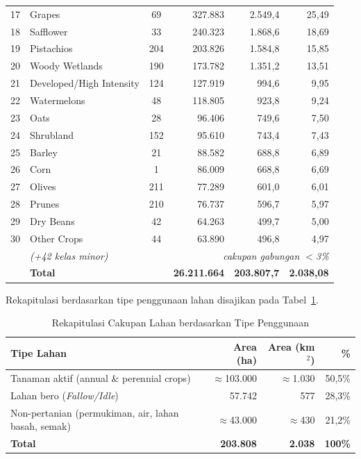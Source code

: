 \begin{longtable}{|r|p{4.5cm}|c|r|r|r|}
17 & Grapes                     & 69  &   327.883 &  2.549,4 &  25,49 \\
18 & Safflower                  & 33  &   240.323 &  1.868,6 &  18,69 \\
19 & Pistachios                 & 204 &   203.826 &  1.584,8 &  15,85 \\
20 & Woody Wetlands             & 190 &   173.782 &  1.351,2 &  13,51 \\
21 & Developed/High Intensity   & 124 &   127.919 &    994,6 &   9,95 \\
22 & Watermelons                & 48  &   118.805 &    923,8 &   9,24 \\
23 & Oats                       & 28  &    96.406 &    749,6 &   7,50 \\
24 & Shrubland                  & 152 &    95.610 &    743,4 &   7,43 \\
25 & Barley                     & 21  &    88.582 &    688,8 &   6,89 \\
26 & Corn                       & 1   &    86.009 &    668,8 &   6,69 \\
27 & Olives                     & 211 &    77.289 &    601,0 &   6,01 \\
28 & Prunes                     & 210 &    76.737 &    596,7 &   5,97 \\
29 & Dry Beans                  & 42  &    64.263 &    499,7 &   5,00 \\
30 & Other Crops                & 44  &    63.890 &    496,8 &   4,97 \\
\hline
   & \textit{(+42 kelas minor)} &     & \multicolumn{3}{r}{\textit{cakupan gabungan $<$3\%}} \\
   & \textbf{Total}             &     & \textbf{26.211.664} & \textbf{203.807,7} & \textbf{2.038,08} \\
\hline
\end{longtable}

Rekapitulasi berdasarkan tipe penggunaan lahan disajikan pada Tabel~\ref{tab:cdl_landtype}.

\begin{table}[htbp]
\centering
\caption{Rekapitulasi Cakupan Lahan berdasarkan Tipe Penggunaan}
\label{tab:cdl_landtype}
\begin{tabularx}{\textwidth}{Xrrr}
\hline
\textbf{Tipe Lahan} & \textbf{Area (ha)} & \textbf{Area (km$^2$)} & \textbf{\%} \\
\hline
Tanaman aktif (annual \& perennial crops) & $\approx$103.000 & $\approx$1.030 & 50,5\% \\
Lahan bero (\textit{Fallow/Idle})         &       57.742     &        577     & 28,3\% \\
Non-pertanian (permukiman, air, lahan basah, semak) & $\approx$43.000 & $\approx$430 & 21,2\% \\
\hline
\textbf{Total}                            & \textbf{203.808} & \textbf{2.038} & \textbf{100\%} \\
\hline
\end{tabularx}
\end{table}

